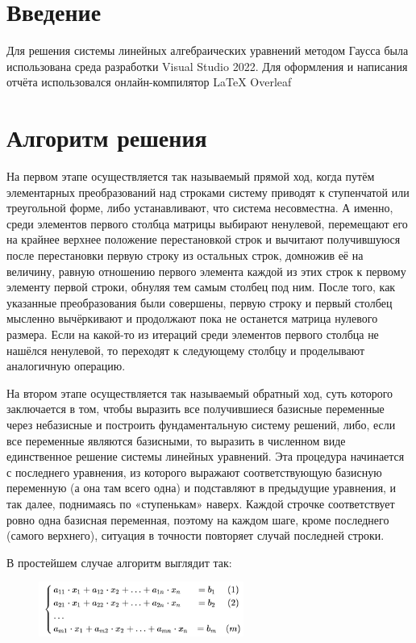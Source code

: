 \documentclass[14pt,a4paper]{scrartcl}
\begin{document}
\tableofcontents
\newpage
\section{Введение}
Для решения системы линейных алгебраических уравнений методом Гаусса была использована среда разработки Visual Studio 2022. Для оформления и написания отчёта использовался онлайн-компилятор LaTeX Overleaf


\newpage
\section{Алгоритм решения}
На первом этапе осуществляется так называемый прямой ход, когда путём элементарных преобразований над строками систему приводят к ступенчатой или треугольной форме, либо устанавливают, что система несовместна. А именно, среди элементов первого столбца матрицы выбирают ненулевой, перемещают его на крайнее верхнее положение перестановкой строк и вычитают получившуюся после перестановки первую строку из остальных строк, домножив её на величину, равную отношению первого элемента каждой из этих строк к первому элементу первой строки, обнуляя тем самым столбец под ним. После того, как указанные преобразования были совершены, первую строку и первый столбец мысленно вычёркивают и продолжают пока не останется матрица нулевого размера. Если на какой-то из итераций среди элементов первого столбца не нашёлся ненулевой, то переходят к следующему столбцу и проделывают аналогичную операцию.

На втором этапе осуществляется так называемый обратный ход, суть которого заключается в том, чтобы выразить все получившиеся базисные переменные через небазисные и построить фундаментальную систему решений, либо, если все переменные являются базисными, то выразить в численном виде единственное решение системы линейных уравнений. Эта процедура начинается с последнего уравнения, из которого выражают соответствующую базисную переменную (а она там всего одна) и подставляют в предыдущие уравнения, и так далее, поднимаясь по «ступенькам» наверх. Каждой строчке соответствует ровно одна базисная переменная, поэтому на каждом шаге, кроме последнего (самого верхнего), ситуация в точности повторяет случай последней строки.

В простейшем случае алгоритм выглядит так:
\begin{figure}[h!]
    \centering
    \includegraphics [width=0.6\textwidth]{formula1}\\
    
    \label{fig:pic2}
\end{figure}
\end{document}
